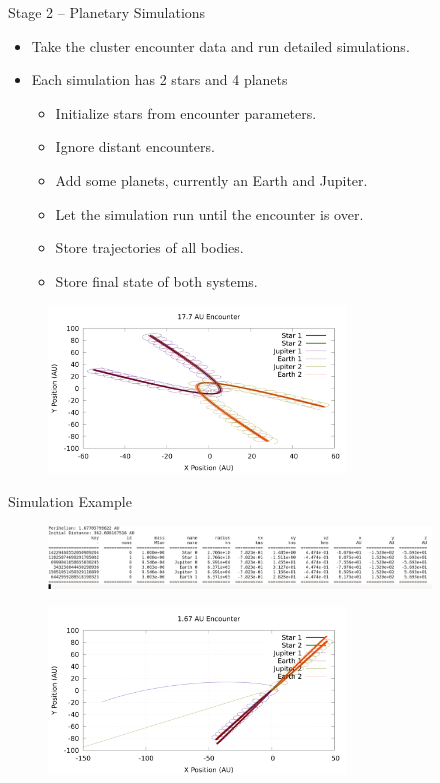 \documentclass{beamer}
\begin{document}
\begin{frame}{Stage 2 -- Planetary Simulations}
    \begin{itemize}
        \item Take the cluster encounter data and run detailed simulations.
        \item Each simulation has 2 stars and 4 planets
        \begin{itemize}
            \item Initialize stars from encounter parameters.
            \item Ignore distant encounters.
            \item Add some planets, currently an Earth and Jupiter.
            \item Let the simulation run until the encounter is over.
            \item Store trajectories of all bodies.
            \item Store final state of both systems.
        \end{itemize}
    \end{itemize}
    \begin{figure}
        \centering
        \includegraphics[height=1.75in]{17_7_AU}
    \end{figure}
\end{frame}

\begin{frame}{Simulation Example}
    \begin{figure}
        \centering
        \includegraphics[width=4.00in]{Params.png}
    \end{figure}
    \begin{figure}
        \centering
        \includegraphics[height=1.75in]{ejection.png}
    \end{figure}
\end{frame}
\end{document}
